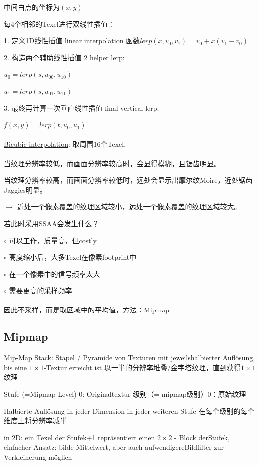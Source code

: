 \documentclass[fleqn]{article}
\begin{document}
中间白点的坐标为$(x,y)$

\noindent 每4个相邻的Texel进行双线性插值：

1. 定义1D线性插值 linear interpolation 函数$lerp(x,v_0,v_1)=v_0+x(v_1-v_0)$

2. 构造两个辅助线性插值 2 helper lerp:

\indent\indent $u_0=lerp(s,u_{00},u_{10})$

\indent\indent $u_1=lerp(s,u_{01},u_{11})$

3. 最终再计算一次垂直线性插值 final vertical lerp:

\indent\indent $f(x,y)=lerp(t,u_0,u_1)$
\\
\\
\underline{Bicubic interpolation}: 取周围16个Texel.
\\
\\
当纹理分辨率较低，而画面分辨率较高时，会显得模糊，且锯齿明显。

\noindent 当纹理分辨率较高，而画面分辨率较低时，远处会显示出摩尔纹Moire，近处锯齿Jaggies明显。

$\rightarrow$ 近处一个像素覆盖的纹理区域较小，远处一个像素覆盖的纹理区域较大。

若此时采用SSAA会发生什么？

$\circ$ 可以工作，质量高，但costly

$\circ$ 高度缩小后，大多Texel在像素footprint中

$\circ$ 在一个像素中的信号频率太大

$\circ$ 需要更高的采样频率
\\
\\
\indent 因此不采样，而是取区域中的平均值，方法：Mipmap

\subsection{Mipmap}

\noindent Mip-Map Stack: Stapel / Pyramide von Texturen mit jeweilshalbierter Auflösung, bis eine $1\times1$-Textur erreicht ist
以一半的分辨率堆叠/金字塔纹理，直到获得$1\times1$纹理

Stufe (=Mipmap-Level) 0: Originaltextur 级别（= mipmap级别）0：原始纹理

Halbierte Auflösung in jeder Dimension in jeder weiteren Stufe 在每个级别的每个维度上将分辨率减半

in 2D: ein Texel der Stufek+1 repräsentiert einen $2\times 2$ - Block derStufek, einfacher Ansatz: bilde Mittelwert, aber auch aufwendigereBildfilter zur Verkleinerung möglich
\end{document}

